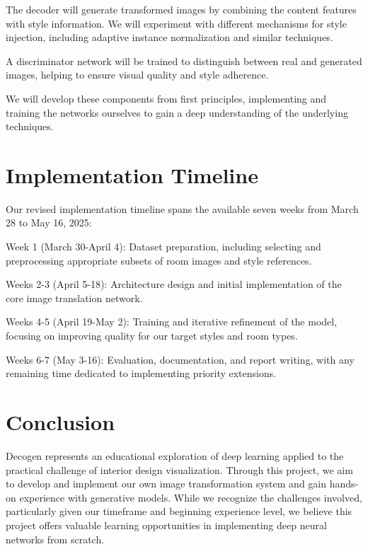 \documentclass[twocolumn,superscriptaddress,aps]{revtex4-1}
\begin{document}
The decoder will generate transformed images by combining the content features with style information. We will experiment with different mechanisms for style injection, including adaptive instance normalization and similar techniques.

A discriminator network will be trained to distinguish between real and generated images, helping to ensure visual quality and style adherence.

We will develop these components from first principles, implementing and training the networks ourselves to gain a deep understanding of the underlying techniques.

\section{Implementation Timeline}

Our revised implementation timeline spans the available seven weeks from March 28 to May 16, 2025:

Week 1 (March 30-April 4): Dataset preparation, including selecting and preprocessing appropriate subsets of room images and style references.

Weeks 2-3 (April 5-18): Architecture design and initial implementation of the core image translation network.

Weeks 4-5 (April 19-May 2): Training and iterative refinement of the model, focusing on improving quality for our target styles and room types.

Weeks 6-7 (May 3-16): Evaluation, documentation, and report writing, with any remaining time dedicated to implementing priority extensions.

\section{Conclusion}

Decogen represents an educational exploration of deep learning applied to the practical challenge of interior design visualization. Through this project, we aim to develop and implement our own image transformation system and gain hands-on experience with generative models. While we recognize the challenges involved, particularly given our timeframe and beginning experience level, we believe this project offers valuable learning opportunities in implementing deep neural networks from scratch.




\end{document}
